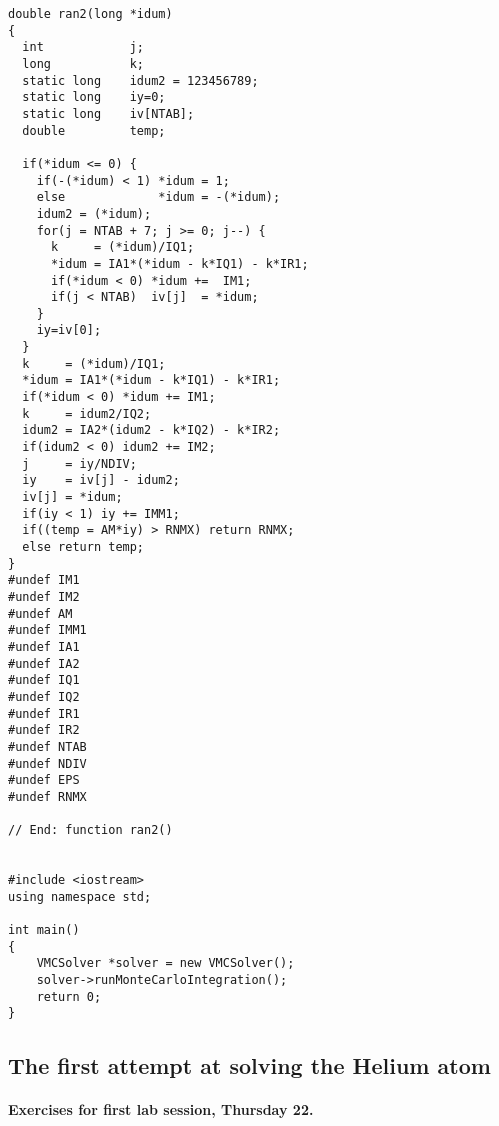 \documentclass[%
twoside,                 %
final,                   %
10pt]{article}
\begin{document}
\begin{verbatim}
double ran2(long *idum)
{
  int            j;
  long           k;
  static long    idum2 = 123456789;
  static long    iy=0;
  static long    iv[NTAB];
  double         temp;

  if(*idum <= 0) {
    if(-(*idum) < 1) *idum = 1;
    else             *idum = -(*idum);
    idum2 = (*idum);
    for(j = NTAB + 7; j >= 0; j--) {
      k     = (*idum)/IQ1;
      *idum = IA1*(*idum - k*IQ1) - k*IR1;
      if(*idum < 0) *idum +=  IM1;
      if(j < NTAB)  iv[j]  = *idum;
    }
    iy=iv[0];
  }
  k     = (*idum)/IQ1;
  *idum = IA1*(*idum - k*IQ1) - k*IR1;
  if(*idum < 0) *idum += IM1;
  k     = idum2/IQ2;
  idum2 = IA2*(idum2 - k*IQ2) - k*IR2;
  if(idum2 < 0) idum2 += IM2;
  j     = iy/NDIV;
  iy    = iv[j] - idum2;
  iv[j] = *idum;
  if(iy < 1) iy += IMM1;
  if((temp = AM*iy) > RNMX) return RNMX;
  else return temp;
}
#undef IM1
#undef IM2
#undef AM
#undef IMM1
#undef IA1
#undef IA2
#undef IQ1
#undef IQ2
#undef IR1
#undef IR2
#undef NTAB
#undef NDIV
#undef EPS
#undef RNMX

// End: function ran2()


#include <iostream>
using namespace std;

int main()
{
    VMCSolver *solver = new VMCSolver();
    solver->runMonteCarloIntegration();
    return 0;
}
\end{verbatim}




\subsection*{The first attempt at solving the Helium atom}

\paragraph{Exercises for first lab session, Thursday 22.}
\end{document}
